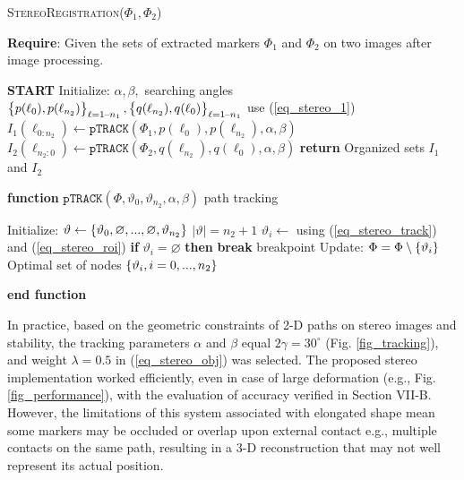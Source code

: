 \documentclass[10pt,letterpaper,journal,final,twoside,twocolumn,nofonttune]{IEEEtran}
\begin{document}
\begin{algorithm}[!t]
\caption{\textsc{StereoRegistration($\Phi_1,\Phi_2$)}}\label{Registration}
\textbf{Require}: Given the sets of extracted markers $\Phi_1$ and $\Phi_2$ on two images after image processing. 
\begin{algorithmic}[1]
\State \textbf{START} Initialize: $\alpha, \beta,$ \Comment searching angles
$\set{p(\ell_0),p(\ell_{n_2})}_{\ell=1\text{--} n_1},\set{q(\ell_{n_2}),q(\ell_0)}_{\ell=1\text{--} n_1}$  \Comment use (\ref{eq_stereo_1})
\State $I_1(\ell_{0:n_2}) \leftarrow  \texttt{pTRACK}(\Phi_1,p(\ell_0),p(\ell_{n_2}),\alpha,\beta)$
\State $I_2(\ell_{n_2:0}) \leftarrow  \texttt{pTRACK}(\Phi_2,q(\ell_{n_2}),q(\ell_0),\alpha,\beta)$
\EndFor
\State \textbf{return} Organized sets $I_1$ and $I_2$\hfill
\end{algorithmic}
\textbf{function}\; {$\texttt{pTRACK}(\Phi,\vartheta_0,\vartheta_{n_2},\alpha,\beta)$} \Comment path tracking
\begin{algorithmic}[1]
\State Initialize: $\vartheta \leftarrow \set{\vartheta_0, \varnothing,...,\varnothing,\vartheta_{n_2}}$ \Comment $|\vartheta| = n_2+1$
\State$\vartheta_i \leftarrow $ using (\ref{eq_stereo_track}) and (\ref{eq_stereo_roi}) 
\State \textbf{if}  $\vartheta_i = \varnothing$ \; \textbf{then} \textbf{break} \Comment breakpoint
\State  Update: $\Phi=\Phi \setminus\set{\vartheta_i}$
\EndFor\\
\Return Optimal set of nodes $\set{\vartheta_i, i = 0,...,n_2}$
\end{algorithmic}
\textbf{end function} %
\label{algorithm1}
\end{algorithm}
In practice, based on the geometric constraints of 2-D paths on stereo images and stability, the tracking parameters $\alpha$ and $\beta$ equal $2\gamma= 30^\circ$ (Fig. \ref{fig_tracking}), and weight $\lambda = 0.5$ in (\ref{eq_stereo_obj}) was selected. The proposed stereo implementation worked efficiently, even in case of large deformation (e.g., Fig. \ref{fig_performance}), with the evaluation of accuracy verified in Section VII-B. However, the limitations of this system associated with elongated shape mean some markers may be occluded or overlap upon external contact e.g., multiple contacts on the same path, resulting in a 3-D reconstruction that may not well represent its actual position.
\end{document}
